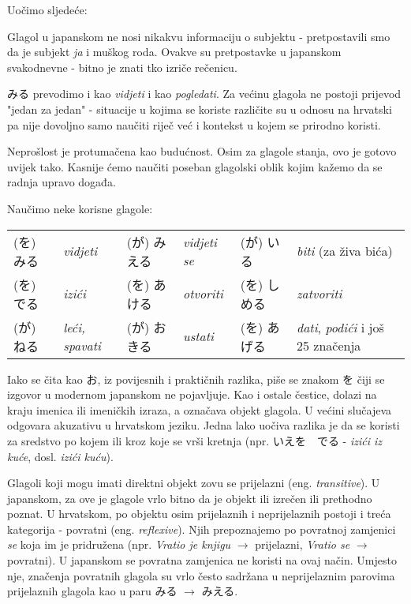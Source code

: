 	Uočimo sljedeće:
	\begin{hyou}
		\item Glagol u japanskom ne nosi nikakvu informaciju o subjektu - pretpostavili smo da je subjekt \textit{ja} i muškog roda. Ovakve su pretpostavke u japanskom svakodnevne - bitno je znati tko izriče rečenicu.
		\item みる prevodimo i kao \textit{vidjeti} i kao \textit{pogledati}. Za većinu glagola ne postoji prijevod "jedan za jedan" - situacije u kojima se koriste različite su u odnosu na hrvatski pa nije dovoljno samo naučiti riječ već i kontekst u kojem se prirodno koristi.
		\item Neprošlost je protumačena kao budućnost. Osim za glagole stanja, ovo je gotovo uvijek tako. Kasnije ćemo naučiti poseban glagolski oblik kojim kažemo da se radnja upravo događa.
	\end{hyou}
	
	
	Naučimo neke korisne glagole:
	
	\vspace{10pt}
	\begin{tabular}{l l l l l l}
		(を) みる & \textit{vidjeti} & (が) みえる & \textit{vidjeti se} & (が) いる & \textit{biti} (za živa bića)\\
		(を) でる & \textit{izići} & (を) あける & \textit{otvoriti} & (を) しめる & \textit{zatvoriti}\\
		(が) ねる & \textit{leći, spavati} & (が) おきる & \textit{ustati} & (を) あげる & \textit{dati}, \textit{podići} i još 25 značenja\\
	\end{tabular}

	
	Iako se čita kao お, iz povijesnih i praktičnih razlika, piše se znakom を čiji se izgovor u modernom japanskom ne pojavljuje. Kao i ostale čestice, dolazi na kraju imenica ili imeničkih izraza, a označava objekt glagola. U većini slučajeva odgovara akuzativu u hrvatskom jeziku. Jedna lako uočiva razlika je da se koristi za sredstvo po kojem ili kroz koje se vrši kretnja (npr. いえを　でる - \textit{izići iz kuće}, dosl. \textit{izići kuću}).
	
	Glagoli koji mogu imati direktni objekt zovu se prijelazni (eng. \textit{transitive}). U japanskom, za ove je glagole vrlo bitno da je objekt ili izrečen ili prethodno poznat. U hrvatskom, po objektu osim prijelaznih i neprijelaznih postoji i treća kategorija - povratni (eng. \textit{reflexive}). Njih prepoznajemo po povratnoj zamjenici \textit{se} koja im je pridružena (npr. \textit{Vratio je knjigu} $\rightarrow$ prijelazni, \textit{Vratio se} $\rightarrow$ povratni). U japanskom se povratna zamjenica ne koristi na ovaj način. Umjesto nje, značenja povratnih glagola su vrlo često sadržana u neprijelaznim parovima prijelaznih glagola kao u paru みる $\rightarrow$ みえる.
	

